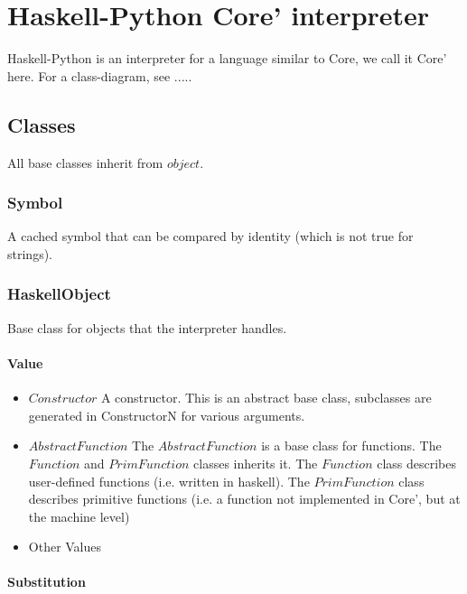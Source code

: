 



\chapter{Haskell-Python Core' interpreter}

Haskell-Python is an interpreter for a language similar to Core, we call it Core' here.
For a class-diagram, see .....

\section*{Classes}

All base classes inherit from $object$.

\subsection{Symbol}

A cached symbol that can be compared by identity (which is not true for strings).

\subsection{HaskellObject}

Base class for objects that the interpreter handles.

\subsubsection{Value}

\begin{itemize}
\item{$Constructor$} A constructor. This is an abstract base class, subclasses are 
generated in ConstructorN for various arguments.
\item{$AbstractFunction$} The $AbstractFunction$ is a base class for functions. The 
$Function$ and $PrimFunction$ classes inherits it. The $Function$ class describes
user-defined functions (i.e. written in haskell). The $PrimFunction$ class describes
primitive functions (i.e. a function not implemented in Core', but at the machine level)
\item{Other Values}
\end{itemize}

\subsubsection{Substitution}

